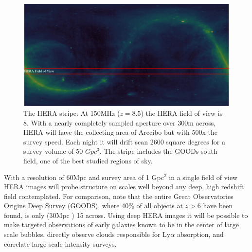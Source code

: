 \documentclass[preprint]{aastex}
\begin{document}
\begin{figure}[t]\centering
\includegraphics[width=\textwidth]{plots/Imaging/HERA_FoV.jpg}
\caption{The HERA stripe.  At 150MHz ($z=8.5$) the HERA field of view is 8\arcdeg.  With a nearly completely sampled aperture over 300m across, HERA will have the collecting area of Arecibo but with 500x the survey speed. Each night it will drift scan 2600 square degrees for a survey volume of 50 $Gpc^3$.  The stripe includes the GOODs south field, one of the best studied regions of sky. \label{fig:HERA_FoV}}
\end{figure}

With a resolution of 60Mpc and survey area of 1 Gpc$^2$ in a single field of view HERA images will probe structure on scales well beyond any deep, high redshift field contemplated. For comparison, note that the entire Great Observatories Origins Deep Survey (GOODS), where 40\% of all objects at $z > 6$ have been found, is only (30Mpc ) 15{\arcmin } across. Using deep HERA images it will be possible to make targeted observations of early galaxies known to be in the center of large scale bubbles, directly observe clouds responsible for Ly$\alpha$ absorption, and correlate large scale intensity surveys.
\end{document}
